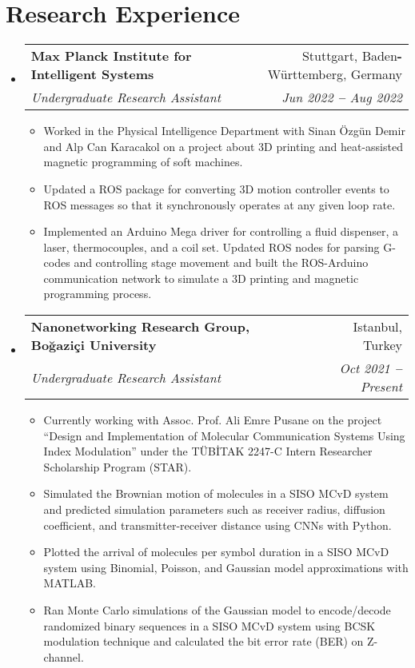 \documentclass[a4paper,11pt]{article}
\makeatletter
\newcommand{\resumeItem}[1]{
	\item\small{
		{#1 \vspace{-2pt}}
	}
}
\newcommand{\resumeSubheading}[4]{
	\vspace{-2pt}\item
	\begin{tabular*}{0.97\textwidth}[t]{l@{\extracolsep{\fill}}r}
		\textbf{#1} & #2 \\
		\textit{\small#3} & \textit{\small #4} \\
	\end{tabular*}\vspace{-7pt}
}
\newcommand{\resumeSubHeadingListStart}{\begin{itemize}[leftmargin=0.15in, label={}]}
\newcommand{\resumeSubHeadingListEnd}{\end{itemize}}
\newcommand{\resumeItemListStart}{\begin{itemize}}
\newcommand{\resumeItemListEnd}{\end{itemize}\vspace{-5pt}}
\makeatother
\begin{document}
	
	
	
	\section{Research Experience}
	\vspace{3pt}
	\resumeSubHeadingListStart
	
	\resumeSubheading
	{Max Planck Institute for Intelligent Systems}{Stuttgart, Baden\textbf{-}Württemberg, Germany}
	{Undergraduate Research Assistant}{Jun 2022 \textbf{--} Aug 2022}
	\resumeItemListStart
	\resumeItem{Worked in the Physical Intelligence Department with Sinan Özgün Demir and Alp Can Karacakol on a project about 3D printing and heat-assisted magnetic programming of soft machines.}
	\resumeItem{Updated a ROS package for converting 3D motion controller events to ROS messages so that it synchronously operates at any given loop rate.}
	\resumeItem{Implemented an Arduino Mega driver for controlling a fluid dispenser, a laser, thermocouples, and a coil set. Updated ROS nodes for parsing G-codes and controlling stage movement and built the ROS-Arduino communication network to simulate a 3D printing and magnetic programming process.}
	\resumeItemListEnd
	
	\resumeSubheading
	{Nanonetworking Research Group, Boğaziçi University}{Istanbul, Turkey}
	{Undergraduate Research Assistant}{Oct 2021 \textbf{--} Present}
	\resumeItemListStart
	\resumeItem{Currently working with Assoc. Prof. Ali Emre Pusane on the project “Design and Implementation of Molecular Communication Systems Using Index Modulation” under the TÜBİTAK 2247-C Intern Researcher Scholarship Program (STAR).}
	\resumeItem{Simulated the Brownian motion of molecules in a SISO MCvD system and predicted simulation parameters such as receiver radius, diffusion coefficient, and transmitter-receiver distance using CNNs with Python.}
	\resumeItem{Plotted the arrival of molecules per symbol duration in a SISO MCvD system using Binomial, Poisson, and Gaussian model approximations with MATLAB.}
	\resumeItem{Ran Monte Carlo simulations of the Gaussian model to encode/decode randomized binary sequences in a SISO MCvD system using BCSK modulation technique and calculated the bit error rate (BER) on Z-channel.}
	\resumeItemListEnd
	
	\resumeSubHeadingListEnd
	
	
	
	
\end{document}
